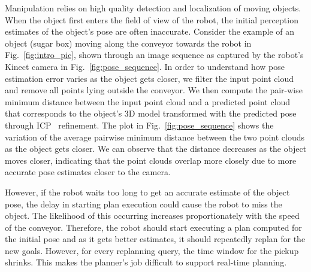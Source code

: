 \documentclass[a4paper]{report}
\begin{document}
    Manipulation relies on high quality detection and localization of moving objects. When the object first enters the field of view of the robot, the initial perception estimates of the object's pose are often inaccurate. Consider the example of an object (sugar box) moving along the conveyor towards the robot in Fig.~\ref{fig:intro_pic}, shown through an image sequence as captured by the robot's Kinect camera in Fig.~\ref{fig:pose_sequence}. In order to understand how pose estimation error varies as the object gets closer, we filter the input point cloud and remove all points lying outside the conveyor. We then compute the pair-wise minimum distance between the input point cloud and a predicted point cloud that corresponds to the object's 3D model transformed with the predicted pose through ICP~\cite{besl1992method} refinement. The plot in Fig.~\ref{fig:pose_sequence} shows the variation of the average pairwise minimum distance between the two point clouds as the object gets closer. We can observe that the distance decreases as the object moves closer, indicating that the point clouds overlap more closely due to more accurate pose estimates closer to the camera.
    
However, if the robot waits too long to get an accurate estimate of the object pose, the delay in starting plan execution could cause the robot to miss the object. The likelihood of this occurring increases proportionately with the speed of the conveyor. Therefore, the robot should start executing a plan computed for the initial pose and as it gets better estimates, it should repeatedly replan for the new goals. However, for every replanning query, the time window for the pickup shrinks. This makes the planner's job difficult to support real-time planning.
\end{document}
